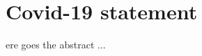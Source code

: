 %
%
%


\chapter*{Covid-19 statement}
\begin{SingleSpace}
ere goes the abstract ...
\end{SingleSpace}
\clearpage